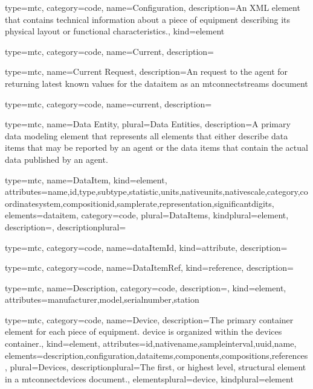 {
  type=mtc,
  category=code,
  name={Configuration},
  description={An XML element that contains technical information about a piece of equipment describing its physical layout or functional characteristics.},
  kind={element}
}


{
  type=mtc,
  category=code,
  name={Current},
  description={}
}


{
  type=mtc,
  name={Current Request},
  description={An  request to the \gls{agent} for returning latest known values for the \gls{dataitem} as an \glspl{mtconnectstream}  document}
}


{
  type=mtc,
  category=code,
  name={current},
  description={}
}


{
  type=mtc,
  name={Data Entity},
  plural={Data Entities},
  description={A primary data modeling element that represents all elements that either describe data items that may be reported by an \gls{agent} or the data items that contain the actual data published by an \gls{agent}.}
}


{
  type=mtc,
  name={DataItem},
  kind={element},
  attributes={\gls{name},\gls{id},\gls{type},\gls{subtype},\gls{statistic},\gls{units},\gls{nativeunits},\gls{nativescale},\gls{category},\gls{coordinatesystem},\gls{compositionid},\gls{samplerate},\gls{representation},\gls{significantdigits}},
  elements={\gls{dataitem}},
  category=code,
  plural={DataItems},
  kindplural={element},
  description={},
  descriptionplural={}
}


{
  type=mtc,
  category=code,
  name={dataItemId},
  kind={attribute},
  description={}
}


{
  type=mtc,
  category=code,
  name={DataItemRef},
  kind={reference},
  description={}
}


{
  type=mtc,
  name={Description},
  category=code,
  description={},
  kind={element},
  attributes={\gls{manufacturer},\gls{model},\gls{serialnumber},\gls{station}}
}


{
  type=mtc,
  category=code,
  name={Device},
  description={The primary container element for each piece of equipment. \gls{device} is organized within the \glspl{device}  container.},
  kind={element},
  attributes={\gls{id},\gls{nativename},\gls{sampleinterval},\gls{uuid},\gls{name}},
  elements={\gls{description},\gls{configuration},\glspl{dataitem},\glspl{component},\glspl{composition},\glspl{reference}},
  plural={Devices},
  descriptionplural={The first, or highest level, \gls{structural element} in a \glspl{mtconnectdevice} document.},
  elementsplural={\gls{device}},
  kindplural={element}
}


